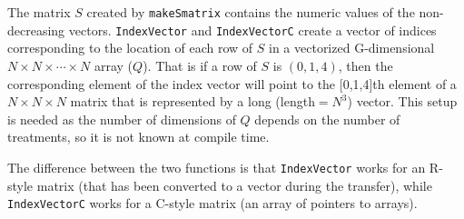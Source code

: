 \documentclass[reqno]{amsart}
\begin{document}
The matrix $S$ created by \texttt{makeSmatrix} contains the numeric values of the
non-decreasing vectors. \texttt{IndexVector} and \texttt{IndexVectorC} create a vector 
of indices corresponding to the location of each row of $S$ in a vectorized 
G-dimensional $N\times N\times\cdots\times N$ array ($Q$). That is if a row
of $S$ is $(0,1,4)$, then the corresponding element of the index vector will 
point to the [0,1,4]th element of a $N\times N\times N$ matrix that is represented
by a long (length$=N^3$) vector. This setup is needed as the number of dimensions
of $Q$ depends on the number of treatments, so it is not known at compile time.

The difference between the two functions is that
\texttt{IndexVector} works for an R-style matrix (that has been converted to a
vector during the transfer), while \texttt{IndexVectorC} works for a C-style matrix 
(an array of pointers to arrays).
\end{document}
